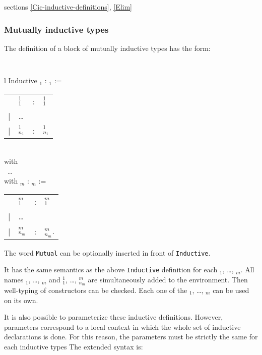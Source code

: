 \SeeAlso sections \ref{Cic-inductive-definitions}, \ref{Elim}

\subsubsection{Mutually inductive types}
\label{Mutual-Inductive}

The definition of a block of mutually inductive types has the form:

\medskip
{\tt 
\begin{tabular}{l}
Inductive {\ident$_1$} : {\type$_1$} :=  \\
\begin{tabular}{clcl}
   & {\ident$_1^1$}     &:& {\type$_1^1$} \\
 | & {\ldots} && \\
 | & {\ident$_{n_1}^1$} &:& {\type$_{n_1}^1$}
\end{tabular}  \\
with\\
~{\ldots} \\
with {\ident$_m$} : {\type$_m$} := \\
\begin{tabular}{clcl}
   & {\ident$_1^m$}     &:& {\type$_1^m$} \\
 | & {\ldots} \\
 | & {\ident$_{n_m}^m$} &:& {\type$_{n_m}^m$}.
\end{tabular}
\end{tabular}
}
\medskip

 The word {\tt Mutual} can be optionally
inserted in front of {\tt Inductive}.

It has the same semantics as the above {\tt Inductive} definition for
each \ident$_1$, {\ldots}, \ident$_m$. All names \ident$_1$, {\ldots},
\ident$_m$ and \ident$_1^1$, \dots, \ident$_{n_m}^m$ are
simultaneously added to the environment. Then
well-typing of constructors can be checked. Each one of the
\ident$_1$, {\ldots}, \ident$_m$ can be used on its own.

It is also possible to parameterize these inductive definitions.
However, parameters correspond to a local
context in which the whole set of inductive declarations is done.  For
this reason, the parameters must be strictly the same for each
inductive types The extended syntax is:

